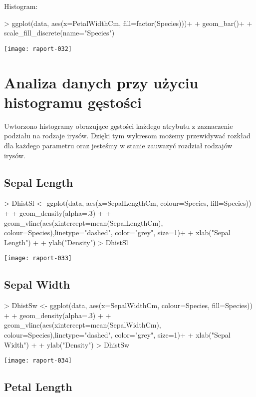 \documentclass{article}
\begin{document}
Histogram:
\begin{Schunk}
\begin{Sinput}
> ggplot(data, aes(x=PetalWidthCm, fill=factor(Species)))+
+   geom_bar()+ 
+   scale_fill_discrete(name="Species")
\end{Sinput}
\end{Schunk}
\texttt{[image: raport-032]}

\newpage

\section{Analiza danych przy użyciu histogramu gęstości}

Uwtorzono histogramy obrazujące gęstości każdego atrybutu z zaznaczenie podziału na rodzaje irysów. Dzięki tym wykresom możemy przewidywać rozkład dla każdego parametru oraz jesteśmy w stanie zauwazyć rozdział rodzajów irysów.

\subsection{Sepal Length}
\begin{Schunk}
\begin{Sinput}
> DhistSl <- ggplot(data, aes(x=SepalLengthCm, colour=Species, fill=Species)) +
+   geom_density(alpha=.3) +
+   geom_vline(aes(xintercept=mean(SepalLengthCm),  colour=Species),linetype="dashed", color="grey", size=1)+
+   xlab("Sepal Length") +  
+   ylab("Density")
> DhistSl
\end{Sinput}
\end{Schunk}
\texttt{[image: raport-033]}

\newpage

\subsection{Sepal Width}

\begin{Schunk}
\begin{Sinput}
> DhistSw <- ggplot(data, aes(x=SepalWidthCm, colour=Species, fill=Species)) +
+   geom_density(alpha=.3) +
+   geom_vline(aes(xintercept=mean(SepalWidthCm),  colour=Species),linetype="dashed", color="grey", size=1)+
+   xlab("Sepal Width") +  
+   ylab("Density") 
> DhistSw
\end{Sinput}
\end{Schunk}
\texttt{[image: raport-034]}
\newpage
\subsection{Petal Length}
\end{document}
